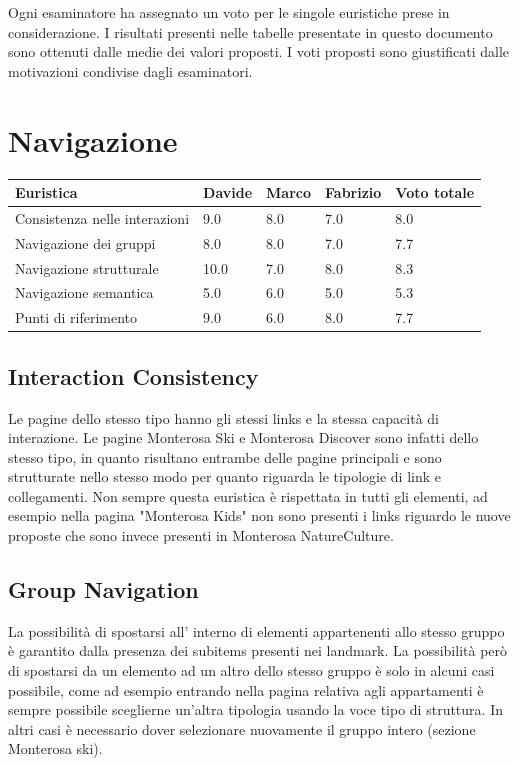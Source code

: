     Ogni esaminatore ha assegnato un voto
    per le singole euristiche prese in considerazione. I risultati presenti
    nelle tabelle presentate in questo documento sono ottenuti dalle medie dei
    valori proposti.
    I voti proposti sono giustificati dalle motivazioni condivise dagli esaminatori.
    \section{Navigazione}
        \begin{table}[H]
        \begin{tabular}{|l|l|l|l|l|}
        \hline \textbf{Euristica} & \textbf{Davide} & \textbf{Marco} & \textbf{Fabrizio} & \textbf{Voto totale} \\ \hline
        Consistenza nelle interazioni & 9.0 & 8.0 & 7.0 & 8.0 \\ \hline
        Navigazione dei gruppi & 8.0 & 8.0 & 7.0 & 7.7 \\ \hline
        Navigazione strutturale & 10.0 & 7.0 & 8.0 & 8.3 \\ \hline
        Navigazione semantica & 5.0 & 6.0 & 5.0 & 5.3 \\ \hline
        Punti di riferimento & 9.0 & 6.0 & 8.0 & 7.7 \\ \hline
        \end{tabular}
        \end{table}
        \subsection{Interaction Consistency}
        Le pagine dello stesso tipo hanno gli stessi links e la stessa capacità
        di interazione. Le pagine Monterosa Ski e Monterosa Discover sono
        infatti dello stesso tipo, in quanto risultano entrambe delle pagine
        principali e sono strutturate nello stesso modo per quanto riguarda le
        tipologie di link e collegamenti.
        Non sempre questa euristica è rispettata in tutti gli elementi, ad
        esempio nella pagina "Monterosa Kids" non sono presenti i links riguardo
        le nuove proposte che sono invece presenti in Monterosa NatureCulture.
    
        \subsection{Group Navigation}
        La possibilità di spostarsi all’ interno di elementi appartenenti allo
        stesso gruppo è garantito dalla presenza dei subitems presenti nei
        landmark. La possibilità però di spostarsi da un elemento ad un altro
        dello stesso gruppo è solo in alcuni casi possibile, come ad esempio
        entrando nella pagina relativa agli appartamenti è sempre possibile
        sceglierne un'altra tipologia usando la voce tipo di struttura. In altri
        casi è necessario dover selezionare nuovamente il gruppo intero (sezione
        Monterosa ski). 

